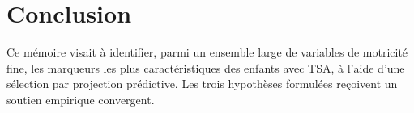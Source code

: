 \documentclass[11pt]{report}
\begin{document}
\bigskip


\bigskip



\bigskip










\chapter{Conclusion}


Ce mémoire visait à identifier, parmi un ensemble large de variables de motricité fine, les marqueurs les plus caractéristiques des enfants avec TSA, à l'aide d'une sélection par projection prédictive. Les trois hypothèses formulées reçoivent un soutien empirique convergent.
\end{document}
